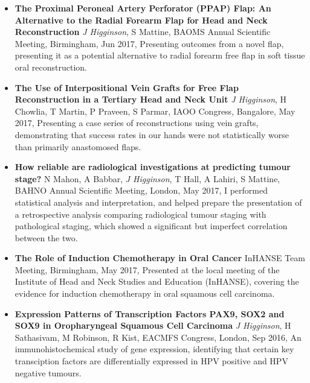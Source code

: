 \begin{itemize}
        \item\textbf{The Proximal Peroneal Artery Perforator (PPAP) Flap: An Alternative to the Radial Forearm Flap for Head and Neck Reconstruction} \emph{J Higginson}, S Mattine, BAOMS Annual Scientific Meeting, Birmingham, Jun 2017, Presenting outcomes from a novel flap, presenting it as a potential alternative to radial forearm free flap in soft tissue oral reconstruction.
        \item\textbf{The Use of Interpositional Vein Grafts for Free Flap Reconstruction in a Tertiary Head and Neck Unit} \emph{J Higginson}, H Chowlia, T Martin, P Praveen, S Parmar, IAOO Congress, Bangalore, May 2017, Presenting a case series of reconstructions using vein grafts, demonstrating that success rates in our hands were not statistically worse than primarily anastomosed flaps.
        \item\textbf{How reliable are radiological investigations at predicting tumour stage?} N Mahon, A Babbar, \emph{J Higginson}, T Hall, A Lahiri, S Mattine, BAHNO Annual Scientific Meeting, London, May 2017, I performed statistical analysis and interpretation, and helped prepare the presentation of a retrospective analysis comparing radiological tumour staging with pathological staging, which showed a significant but imperfect correlation between the two.
        \item\textbf{The Role of Induction Chemotherapy in Oral Cancer} InHANSE Team Meeting, Birmingham, May 2017, Presented at the local meeting of the Institute of Head and Neck Studies and Education (InHANSE), covering the evidence for induction chemotherapy in oral squamous cell carcinoma.
        \item\textbf{Expression Patterns of Transcription Factors PAX9, SOX2 and SOX9 in Oropharyngeal Squamous Cell Carcinoma} \emph{J Higginson}, H Sathasivam, M Robinson, R Kist, EACMFS Congress, London, Sep 2016, An immunohistochemical study of gene expression, identifying that certain key transciption factors are differentially expressed in HPV positive and HPV negative tumours.
\end{itemize}


